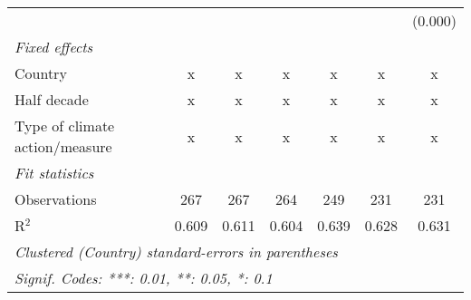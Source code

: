 \begin{tabular}{lcccccc}
                                        &         &         &         &         &         & (0.000)\\   
   \emph{Fixed effects}\\
   Country                              & x       & x       & x       & x       & x       & x\\  
   Half decade                          & x       & x       & x       & x       & x       & x\\  
   Type of climate action/measure       & x       & x       & x       & x       & x       & x\\  
   \midrule \emph{Fit statistics}\\
   Observations                         & 267     & 267     & 264     & 249     & 231     & 231\\  
   R$^2$                                & 0.609   & 0.611   & 0.604   & 0.639   & 0.628   & 0.631\\  
   \midrule
   \multicolumn{7}{l}{\emph{Clustered (Country) standard-errors in parentheses}}\\
   \multicolumn{7}{l}{\emph{Signif. Codes: ***: 0.01, **: 0.05, *: 0.1}}\\
\end{tabular}
\par\endgroup


